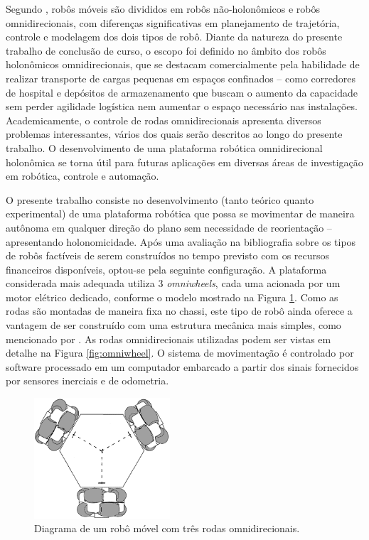 Segundo \citet{lynch2017modern}, robôs móveis são divididos em robôs não-holonômicos e robôs omnidirecionais, com diferenças significativas em planejamento de trajetória, controle e modelagem dos dois tipos de robô. Diante da natureza do presente trabalho de conclusão de curso, o escopo foi definido no âmbito dos robôs holonômicos omnidirecionais, que se destacam comercialmente pela habilidade de realizar transporte de cargas pequenas em espaços confinados -- como corredores de hospital e depósitos de armazenamento que buscam o aumento da capacidade sem perder agilidade logística nem aumentar o espaço necessário nas instalações. Academicamente, o controle de rodas omnidirecionais apresenta diversos problemas interessantes, vários dos quais serão descritos ao longo do presente trabalho. O desenvolvimento de uma plataforma robótica omnidirecional holonômica se torna útil para futuras aplicações em diversas áreas de investigação em robótica, controle e automação.


O presente trabalho consiste no desenvolvimento (tanto teórico quanto experimental) de uma plataforma robótica que possa se movimentar de maneira autônoma em qualquer direção do plano sem necessidade de reorientação -- apresentando holonomicidade. Após uma avaliação na bibliografia sobre os tipos de robôs factíveis de serem construídos no tempo previsto com os recursos financeiros disponíveis, optou-se pela seguinte configuração. A plataforma considerada mais adequada utiliza 3 \emph{omniwheels}, cada uma acionada por um motor elétrico dedicado, conforme o modelo mostrado na Figura \ref{fig:tomr_ritter}. Como as rodas são montadas de maneira fixa no chassi, este tipo de robô ainda oferece a vantagem de ser construído com uma estrutura mecânica mais simples, como mencionado por \citet{siciliano2016springer}. As rodas omnidirecionais utilizadas podem ser vistas em detalhe na Figura \ref{fig:omniwheel}. O sistema de movimentação é controlado por software processado em um computador embarcado a partir dos sinais fornecidos por sensores inerciais e de odometria.

\begin{figure}[h]
  \centering
  \includegraphics[width = 0.45\textwidth]{imagens/tomr_ritter_mod}
  \caption{Diagrama de um robô móvel com três rodas omnidirecionais.}
  \label{fig:tomr_ritter}
\end{figure}

